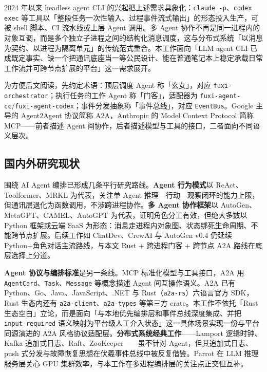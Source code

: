 2024 年以来 headless agent CLI 的兴起把上述需求具象化：\texttt{claude -p}、\texttt{codex exec} 等工具以「整段任务一次性输入、过程事件流式输出」的形态投入生产，可被 shell 脚本、CI 流水线或上层 Agent 调用。多 Agent 协作不再是同一进程内的对象互调，而是多个独立子进程之间的结构化消息调度，这与分布式系统「以消息为契约、以进程为隔离单元」的传统范式重合。本工作面向「LLM agent CLI 已成既定事实、缺一个把通讯底座当一等公民设计、能在普通笔记本上稳定承载日常工作流并可跨节点扩展的平台」这一需求展开。

为方便后文阅读，先约定术语：顶层调度 Agent 称「玄女」，对应 \texttt{fuxi-orchestrator}；执行任务的工作 Agent 称「门客」，适配器为 \texttt{fuxi-agent-cc}/\texttt{fuxi-agent-codex}；事件分发抽象称「事件总线」，对应 \texttt{EventBus}。Google 主导的 Agent2Agent 协议简称 A2A，Anthropic 的 Model Context Protocol 简称 MCP——前者描述 Agent 间协作，后者描述模型与工具的接口，二者面向不同语义层次。

\subsection{国内外研究现状}

围绕 AI Agent 编排已形成几条平行研究路线。\textbf{Agent 行为模式}以 ReAct\parencite{yao2022react}、Toolformer\parencite{schick2023toolformer}、MRKL\parencite{karpas2022mrkl} 为代表，关注单 Agent 推理—行动—观察闭环的能力上限，但通讯层退化为函数调用，不涉跨进程协作。\textbf{多 Agent 协作框架}以 AutoGen\parencite{wu2023autogen}、MetaGPT\parencite{hong2023metagpt}、CAMEL\parencite{li2023camel}、AutoGPT\parencite{significantgravitas2023autogpt} 为代表，证明角色分工有效，但绝大多数以 Python 框架或云端 SaaS 为形态：消息走进程内对象图、状态绑死生命周期、不能跨节点扩展。后续工作如 ChatDev\parencite{qian2024chatdev}、CrewAI\parencite{crewai_2024} 与 AutoGen v0.4\parencite{ag2_2024} 仍延续 Python+角色对话主流路线，与本文 Rust + 跨进程门客 + 跨节点 A2A 路线在底层选择上分道。

\textbf{Agent 协议与编排标准}是另一条线。MCP\parencite{anthropic2024mcp} 标准化模型与工具接口，A2A\parencite{a2aproject2025a2a} 用 \texttt{AgentCard}、\texttt{Task}、\texttt{Message} 等概念描述 Agent 间互操作语义。A2A 已有 Python、Go、Java、JavaScript、.NET 与 Rust（\texttt{a2a-rs}）六语言官方 SDK，Rust 生态内还有 \texttt{a2a-client}、\texttt{a2a-types} 等第三方 crate。本工作不依托「Rust 生态空白」立论，而是面向「与本地优先编排层和事件总线深度集成、并把 \texttt{input-required} 语义映射为平台级人工介入状态」这一具体场景实现一份与平台同源演进的 A2A 风格协议适配层。\textbf{分布式系统经典工作}——Lamport 逻辑时钟\parencite{lamport1978time}、Kafka 追加式日志\parencite{kreps2011kafka}、Raft\parencite{ongaro2014raft}、ZooKeeper\parencite{hunt2010zookeeper}——虽不针对 Agent，但其追加式日志、push 式分发与故障恢复思想在伏羲事件总线中被反复借鉴。Parrot\parencite{lin2024parrot} 在 LLM 推理服务层关心 GPU 集群效率，与本工作在多进程编排层的关注点正交但互补。

